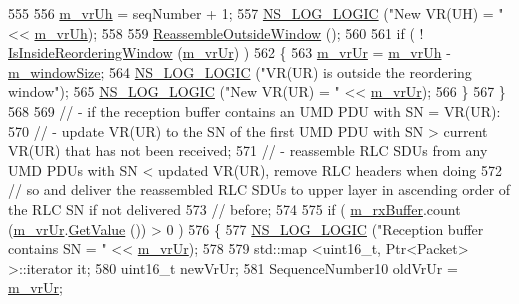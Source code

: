 \begin{DoxyCode}
555 
556       \hyperlink{classns3_1_1LteRlcUmLowLat_aa5ff652a885ef59bdda2446f6abd3cd8}{m\_vrUh} = seqNumber + 1;
557       \hyperlink{group__logging_ga88acd260151caf2db9c0fc84997f45ce}{NS\_LOG\_LOGIC} (\textcolor{stringliteral}{"New VR(UH) = "} << \hyperlink{classns3_1_1LteRlcUmLowLat_aa5ff652a885ef59bdda2446f6abd3cd8}{m\_vrUh});
558 
559       \hyperlink{classns3_1_1LteRlcUmLowLat_a4443ee4ffdcbda9c568dafb97828497e}{ReassembleOutsideWindow} ();
560 
561       \textcolor{keywordflow}{if} ( ! \hyperlink{classns3_1_1LteRlcUmLowLat_aae57ed7d1b7b9bff39ac4e70cddfbd80}{IsInsideReorderingWindow} (\hyperlink{classns3_1_1LteRlcUmLowLat_a614417e6259a873e3d2dbde0d67a1df6}{m\_vrUr}) )
562         \{
563           \hyperlink{classns3_1_1LteRlcUmLowLat_a614417e6259a873e3d2dbde0d67a1df6}{m\_vrUr} = \hyperlink{classns3_1_1LteRlcUmLowLat_aa5ff652a885ef59bdda2446f6abd3cd8}{m\_vrUh} - \hyperlink{classns3_1_1LteRlcUmLowLat_aecfdc0c06f03a1aa8958f06e077fd2fd}{m\_windowSize};
564           \hyperlink{group__logging_ga88acd260151caf2db9c0fc84997f45ce}{NS\_LOG\_LOGIC} (\textcolor{stringliteral}{"VR(UR) is outside the reordering window"});
565           \hyperlink{group__logging_ga88acd260151caf2db9c0fc84997f45ce}{NS\_LOG\_LOGIC} (\textcolor{stringliteral}{"New VR(UR) = "} << \hyperlink{classns3_1_1LteRlcUmLowLat_a614417e6259a873e3d2dbde0d67a1df6}{m\_vrUr});
566         \}
567     \}
568 
569   \textcolor{comment}{// - if the reception buffer contains an UMD PDU with SN = VR(UR):}
570   \textcolor{comment}{//    - update VR(UR) to the SN of the first UMD PDU with SN > current VR(UR) that has not been received;}
571   \textcolor{comment}{//    - reassemble RLC SDUs from any UMD PDUs with SN < updated VR(UR), remove RLC headers when doing}
572   \textcolor{comment}{//      so and deliver the reassembled RLC SDUs to upper layer in ascending order of the RLC SN if not
       delivered}
573   \textcolor{comment}{//      before;}
574 
575   \textcolor{keywordflow}{if} ( \hyperlink{classns3_1_1LteRlcUmLowLat_aedc712a69598a77115ae9a67133b53d8}{m\_rxBuffer}.count (\hyperlink{classns3_1_1LteRlcUmLowLat_a614417e6259a873e3d2dbde0d67a1df6}{m\_vrUr}.\hyperlink{classns3_1_1SequenceNumber10_a9dcaea04bc415e169e7e0020ce579d01}{GetValue} ()) > 0 )
576     \{
577       \hyperlink{group__logging_ga88acd260151caf2db9c0fc84997f45ce}{NS\_LOG\_LOGIC} (\textcolor{stringliteral}{"Reception buffer contains SN = "} << \hyperlink{classns3_1_1LteRlcUmLowLat_a614417e6259a873e3d2dbde0d67a1df6}{m\_vrUr});
578 
579       std::map <uint16\_t, Ptr<Packet> >::iterator it;
580       uint16\_t newVrUr;
581       SequenceNumber10 oldVrUr = \hyperlink{classns3_1_1LteRlcUmLowLat_a614417e6259a873e3d2dbde0d67a1df6}{m\_vrUr};

\end{DoxyCode}
